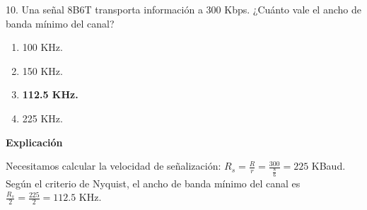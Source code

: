 \documentclass[10pt,a4paper]{article}
\begin{document}
10. Una señal 8B6T transporta información a 300 Kbps. ¿Cuánto vale el ancho de banda mínimo del canal?

\begin{enumerate}[label=\alph*]
    \item 100 KHz.
    \item 150 KHz.
    \item \textbf{112.5 KHz.}
    \item 225 KHz.
\end{enumerate}
\textbf{Explicación}

Necesitamos calcular la velocidad de señalización: $R_s = \frac{R}{r} = \frac{300}{\frac{8}{6}} = 225$ KBaud. Según el criterio de Nyquist, el ancho de banda mínimo del canal es  
$\frac{R_s}{2} = \frac{225}{2} = 112.5$ KHz.
\end{document}
